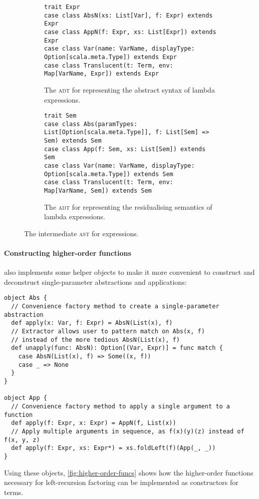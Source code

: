 \documentclass[../../../main.tex]{subfiles}
\begin{document}
\begin{figure}
\begin{subfigure}{\textwidth}
\begin{verbatim}
trait Expr
case class AbsN(xs: List[Var], f: Expr) extends Expr
case class AppN(f: Expr, xs: List[Expr]) extends Expr
case class Var(name: VarName, displayType: Option[scala.meta.Type]) extends Expr
case class Translucent(t: Term, env: Map[VarName, Expr]) extends Expr
\end{verbatim}
\caption{The  \textsc{adt} for representing the abstract syntax of lambda expressions.}
\label{fig:expr-adt}
\end{subfigure}
%
\begin{subfigure}{\textwidth}
\vspace{3ex}
\begin{verbatim}
trait Sem
case class Abs(paramTypes: List[Option[scala.meta.Type]], f: List[Sem] => Sem) extends Sem
case class App(f: Sem, xs: List[Sem]) extends Sem
case class Var(name: VarName, displayType: Option[scala.meta.Type]) extends Sem
case class Translucent(t: Term, env: Map[VarName, Sem]) extends Sem
\end{verbatim}
\caption{The  \textsc{adt} for representing the residualising semantics of lambda expressions.}
\label{fig:sem-adt}
\end{subfigure}
\caption{The intermediate \textsc{ast} for expressions.}
\end{figure}

\paragraph{Constructing higher-order functions}
 also implements some helper objects to make it more convenient to construct and deconstruct single-parameter abstractions and applications:
\begin{verbatim}
object Abs {
  // Convenience factory method to create a single-parameter abstraction
  def apply(x: Var, f: Expr) = AbsN(List(x), f)
  // Extractor allows user to pattern match on Abs(x, f)
  // instead of the more tedious AbsN(List(x), f)
  def unapply(func: AbsN): Option[(Var, Expr)] = func match {
    case AbsN(List(x), f) => Some((x, f))
    case _ => None
  }
}

object App {
  // Convenience factory method to apply a single argument to a function
  def apply(f: Expr, x: Expr) = AppN(f, List(x))
  // Apply multiple arguments in sequence, as f(x)(y)(z) instead of f(x, y, z)
  def apply(f: Expr, xs: Expr*) = xs.foldLeft(f)(App(_, _))
}
\end{verbatim}
%
Using these objects, \cref{fig:higher-order-funcs} shows how the higher-order functions necessary for left-recursion factoring can be implemented as constructors for  terms.
\end{document}
